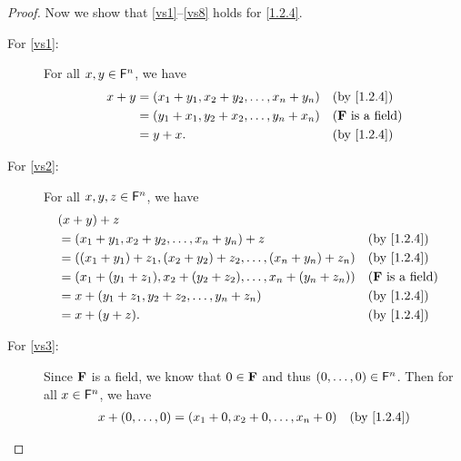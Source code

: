 \begin{proof}
    Now we show that \ref{vs1}--\ref{vs8} holds for \cref{1.2.4}.
    \begin{description}
        \item[For \ref{vs1}:]
            For all \(x, y \in \mathsf{F}^{n}\), we have
            \begin{align*}
                x + y & = \p{x_{1} + y_{1}, x_{2} + y_{2}, \dots, x_{n} + y_{n}} &  & \text{(by \cref{1.2.4})}   \\
                      & = \p{y_{1} + x_{1}, y_{2} + x_{2}, \dots, y_{n} + x_{n}} &  & \text{(\(\F\) is a field)} \\
                      & = y + x.                                                 &  & \text{(by \cref{1.2.4})}
            \end{align*}
        \item[For \ref{vs2}:]
            For all \(x, y, z \in \mathsf{F}^{n}\), we have
            \begin{align*}
                 & \p{x + y} + z                                                                                                                \\
                 & = \p{x_{1} + y_{1}, x_{2} + y_{2}, \dots, x_{n} + y_{n}} + z                                 &  & \text{(by \cref{1.2.4})}   \\
                 & = \p{\p{x_{1} + y_{1}} + z_{1}, \p{x_{2} + y_{2}} + z_{2}, \dots, \p{x_{n} + y_{n}} + z_{n}} &  & \text{(by \cref{1.2.4})}   \\
                 & = \p{x_{1} + \p{y_{1} + z_{1}}, x_{2} + \p{y_{2} + z_{2}}, \dots, x_{n} + \p{y_{n} + z_{n}}} &  & \text{(\(\F\) is a field)} \\
                 & = x + \p{y_{1} + z_{1}, y_{2} + z_{2}, \dots, y_{n} + z_{n}}                                 &  & \text{(by \cref{1.2.4})}   \\
                 & = x + \p{y + z}.                                                                             &  & \text{(by \cref{1.2.4})}
            \end{align*}
        \item[For \ref{vs3}:]
            Since \(\mathbf{F}\) is a field, we know that \(0 \in \mathbf{F}\) and thus \(\left\lparen0, \dots, 0\right\rparen \in \mathsf{F}^{n}\).
            Then for all \(x \in \mathsf{F}^{n}\), we have
            \begin{align*}
                x + \p{0, \dots, 0} & = \p{x_{1} + 0, x_{2} + 0, \dots, x_{n} + 0} &  & \text{(by \cref{1.2.4})}   \\

\end{align*}
\end{description}
\end{proof}
